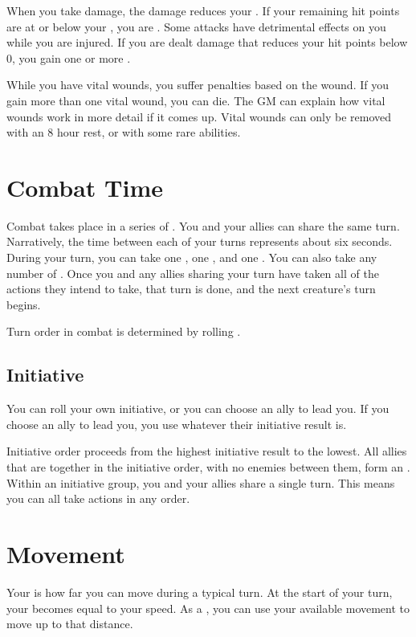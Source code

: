   When you take damage, the damage reduces your .
  If your remaining hit points are at or below your , you are .
  Some attacks have detrimental effects on you while you are injured.
  If you are dealt damage that reduces your hit points below 0, you gain one or more .

  While you have vital wounds, you suffer penalties based on the wound.
  If you gain more than one vital wound, you can die.
  The GM can explain how vital wounds work in more detail if it comes up.
  Vital wounds can only be removed with an 8 hour rest, or with some rare abilities.

\section{Combat Time}
    Combat takes place in a series of .
    You and your allies can share the same turn.
    Narratively, the time between each of your turns represents about six seconds.
    During your turn, you can take one , one , and one .
    You can also take any number of .
    Once you and any allies sharing your turn have taken all of the actions they intend to take, that turn is done, and the next creature's turn begins.

    Turn order in combat is determined by rolling .
  \subsection{Initiative}\label{Initiative}
    You can roll your own initiative, or you can choose an ally to lead you.
    If you choose an ally to lead you, you use whatever their initiative result is.

    Initiative order proceeds from the highest initiative result to the lowest.
    All allies that are together in the initiative order, with no enemies between them, form an .
    Within an initiative group, you and your allies share a single turn.
    This means you can all take actions in any order.

\section{Movement}\label{Movement}
  Your  is how far you can move during a typical turn.
  At the start of your turn, your  becomes equal to your speed.
  As a , you can use your available movement to move up to that distance.

